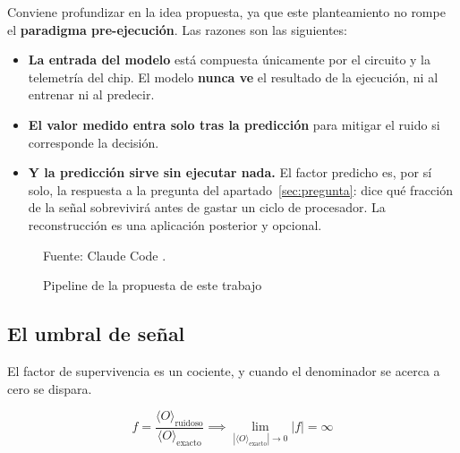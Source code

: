 Conviene profundizar en la idea propuesta, ya que este planteamiento no rompe el \textbf{paradigma pre-ejecución}. Las razones son las siguientes:

\begin{itemize}
    \item \textbf{La entrada del modelo} está compuesta únicamente por el circuito y la telemetría del chip. El modelo \textbf{nunca ve} el resultado de la ejecución, ni al entrenar ni al predecir.
    \item \textbf{El valor medido entra solo tras la predicción} para mitigar el ruido si corresponde la decisión.
    \item \textbf{Y la predicción sirve sin ejecutar nada.} El factor predicho es, por sí solo, la respuesta a la pregunta del apartado~\ref{sec:pregunta}: dice qué fracción de la señal sobrevivirá antes de gastar un ciclo de procesador. La reconstrucción es una aplicación posterior y opcional.
\end{itemize}

\begin{figure}[htbp]
    \centering
    \caption{Pipeline de la propuesta de este trabajo}
    \label{fig:reconstruccion}

    

    {\footnotesize Fuente: Claude Code \cite{anthropic_claude}.}
\end{figure}


\subsection{El umbral de señal}
\label{sec:umbral}

El factor de supervivencia es un cociente, y cuando el denominador se acerca a cero se dispara.

\begin{equation}
\label{eq:divergencia_factor}
f = \frac{\langle O \rangle_{\text{ruidoso}}}{\langle O \rangle_{\text{exacto}}} \implies \lim_{|\langle O \rangle_{\text{exacto}}| \to 0} |f| = \infty
\end{equation}

